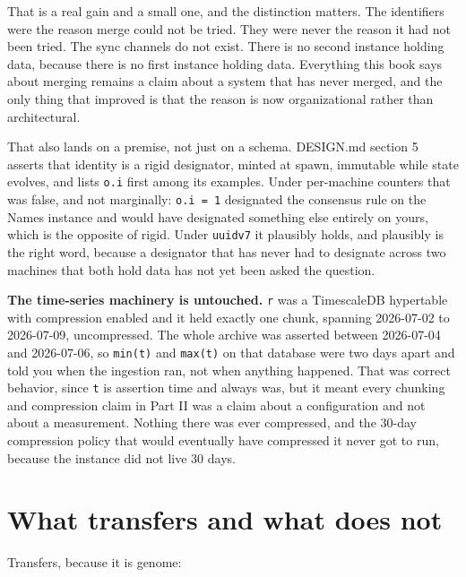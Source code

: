 That is a real gain and a small one, and the distinction matters. The identifiers were the reason merge could not be tried. They were never the reason it had not been tried. The sync channels do not exist. There is no second instance holding data, because there is no first instance holding data. Everything this book says about merging remains a claim about a system that has never merged, and the only thing that improved is that the reason is now organizational rather than architectural.

That also lands on a premise, not just on a schema. DESIGN.md section 5 asserts that identity is a rigid designator, minted at spawn, immutable while state evolves, and lists \texttt{o.i} first among its examples. Under per-machine counters that was false, and not marginally: \texttt{o.i = 1} designated the consensus rule on the Names instance and would have designated something else entirely on yours, which is the opposite of rigid. Under \texttt{uuidv7} it plausibly holds, and plausibly is the right word, because a designator that has never had to designate across two machines that both hold data has not yet been asked the question.

\textbf{The time-series machinery is untouched.} \texttt{r} was a TimescaleDB hypertable with compression enabled and it held exactly one chunk, spanning 2026-07-02 to 2026-07-09, uncompressed. The whole archive was asserted between 2026-07-04 and 2026-07-06, so \texttt{min(t)} and \texttt{max(t)} on that database were two days apart and told you when the ingestion ran, not when anything happened. That was correct behavior, since \texttt{t} is assertion time and always was, but it meant every chunking and compression claim in Part II was a claim about a configuration and not about a measurement. Nothing there was ever compressed, and the 30-day compression policy that would eventually have compressed it never got to run, because the instance did not live 30 days.

\section{What transfers and what does not}

Transfers, because it is genome:

